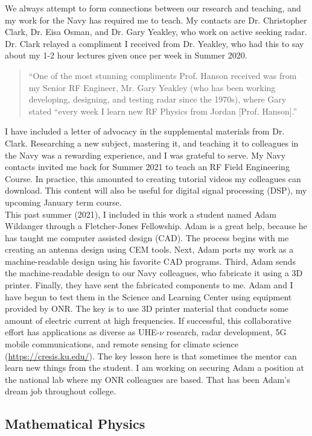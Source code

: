 \documentclass[../../../main.tex]{subfiles}
\begin{document}
We always attempt to form connections between our research and teaching, and my work for the Navy has required me to teach.  My contacts are Dr. Christopher Clark, Dr. Eisa Osman, and Dr. Gary Yeakley, who work on active seeking radar.  Dr. Clark relayed a compliment I received from Dr. Yeakley, who had this to say about my 1-2 hour lectures given once per week in Summer 2020.
\begin{quote}
``One of the most stunning compliments Prof. Hanson received was from my Senior RF Engineer, Mr. Gary Yeakley (who has been working developing, designing, and testing radar since the 1970s), where Gary stated ``every week I learn new RF Physics from Jordan [Prof. Hanson].''
\end{quote}
I have included a letter of advocacy in the supplemental materials from Dr. Clark.  Researching a new subject, mastering it, and teaching it to colleagues in the Navy was a rewarding experience, and I was grateful to serve.  My Navy contacts invited me back for Summer 2021 to teach an RF Field Engineering Course.  In practice, this amounted to creating tutorial videos my colleagues can download.  This content will also be useful for digital signal processing (DSP), my upcoming January term course.
\\
\vspace{0.25cm}
This past summer (2021), I included in this work a student named Adam Wildanger through a Fletcher-Jones Fellowship.  Adam is a great help, because he has taught me computer assisted design (CAD).  The process begins with me creating an antenna design using CEM tools.  Next, Adam ports my work as a machine-readable design using his favorite CAD programs.  Third, Adam sends the machine-readable design to our Navy colleagues, who fabricate it using a 3D printer.  Finally, they have sent the fabricated components to me.  Adam and I have begun to test them in the Science and Learning Center using equipment provided by ONR.  The key is to use 3D printer material that conducts some amount of electric current at high frequencies.  If successful, this collaborative effort has applications as diverse as UHE-$\nu$ research, radar development, 5G mobile communications, and remote sensing for climate science (\url{https://cresis.ku.edu/}).  The key lesson here is that sometimes the mentor can learn new things from the student.  I am working on securing Adam a position at the national lab where my ONR colleagues are based.  That has been Adam's dream job throughout college.

\subsection{Mathematical Physics}
\label{sec:math_phys}
\end{document}
